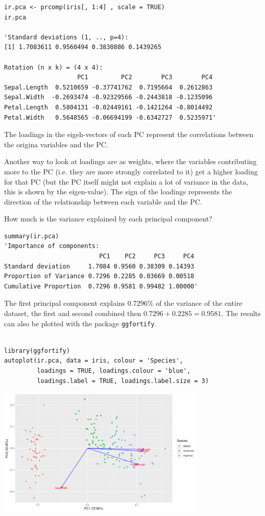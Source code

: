 \documentclass{article}
\begin{document}
\begin{lstlisting}
ir.pca <- prcomp(iris[, 1:4] , scale = TRUE)
ir.pca

'Standard deviations (1, .., p=4):
[1] 1.7083611 0.9560494 0.3830886 0.1439265

Rotation (n x k) = (4 x 4):
                    PC1         PC2        PC3        PC4
Sepal.Length  0.5210659 -0.37741762  0.7195664  0.2612863
Sepal.Width  -0.2693474 -0.92329566 -0.2443818 -0.1235096
Petal.Length  0.5804131 -0.02449161 -0.1421264 -0.8014492
Petal.Width   0.5648565 -0.06694199 -0.6342727  0.5235971'
\end{lstlisting}

The loadings in the eigeh-vectors of each PC represent the correlations between the origina variables and the PC. \par 
Another way to look at loadings are as weights, where the variables contributing more to the PC (i.e. they are more strongly correlated to it) get a higher loading for that PC (but the PC itself might not explain a lot of variance in the data, this is shown by the eigen-value). The sign of the loadings represents the direction of the relationship between each variable and the PC.\par 
How much is the variance explained by each principal component?
\begin{lstlisting}
summary(ir.pca)
'Importance of components:
                          PC1    PC2     PC3     PC4
Standard deviation     1.7084 0.9560 0.38309 0.14393
Proportion of Variance 0.7296 0.2285 0.03669 0.00518
Cumulative Proportion  0.7296 0.9581 0.99482 1.00000'
\end{lstlisting}

The first principal component explains 0.7296\% of the variance of the entire dataset, the first and second combined then $0.7296+0.2285=0.9581$. The results can also be plotted with the package \texttt{ggfortify}.

\begin{lstlisting}

library(ggfortify)
autoplot(ir.pca, data = iris, colour = 'Species',
         loadings = TRUE, loadings.colour = 'blue',
         loadings.label = TRUE, loadings.label.size = 3)
\end{lstlisting}

\begin{center}
    \includegraphics[width = 0.75\textwidth]{lab4/iris-pcs.png}
\end{center}
\end{document}
